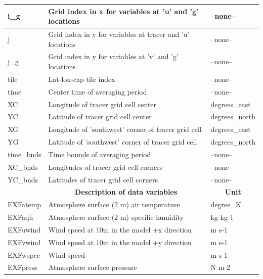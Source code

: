 \begin{longtable}{|m{}|m{}|m{}|}
i\_g &Grid index in x for variables at 'u' and 'g' locations &--none--  \\ \hline
j &Grid index in y for variables at tracer and 'u' locations &--none--  \\ \hline
j\_g &Grid index in y for variables at 'v' and 'g' locations &--none--  \\ \hline
tile &Lat-lon-cap tile index &--none--  \\ \hline
time &Center time of averaging period &--none--  \\ \hline
XC &Longitude of tracer grid cell center &degrees\_east  \\ \hline
YC &Latitude of tracer grid cell center &degrees\_north  \\ \hline
XG &Longitude of 'southwest' corner of tracer grid cell &degrees\_east  \\ \hline
YG &Latitude of 'southwest' corner of tracer grid cell &degrees\_north  \\ \hline
time\_bnds &Time bounds of averaging period &--none--  \\ \hline
XC\_bnds &Longitudes of tracer grid cell corners &--none--  \\ \hline
YC\_bnds &Latitudes of tracer grid cell corners &--none--  \\ \hline
\rowcolor{lightgray} \multicolumn{1}{|c|}{\textbf{Variables}} & \multicolumn{1}{|c|}{\textbf{Description of data variables}} &  \multicolumn{1}{|c|}{\textbf{Unit}}\\ \hline
EXFatemp &Atmosphere surface (2 m) air temperature  &degree\_K  \\ \hline
EXFaqh &Atmosphere surface (2 m) specific humidity  &kg kg-1  \\ \hline
EXFuwind &Wind speed at 10m in the model +x direction &m s-1  \\ \hline
EXFvwind &Wind speed at 10m in the model +y direction &m s-1  \\ \hline
EXFwspee &Wind speed &m s-1  \\ \hline
EXFpress &Atmosphere surface pressure &N m-2  \\ \hline
\end{longtable}

\newp
\pagebreak
